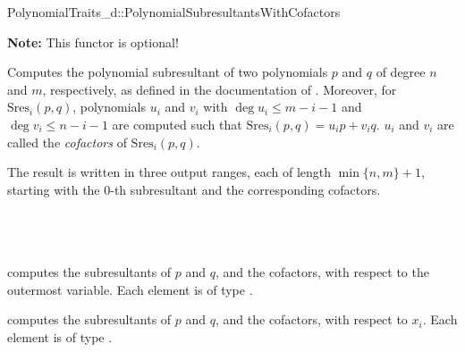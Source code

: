 \begin{ccRefConcept}{PolynomialTraits_d::PolynomialSubresultantsWithCofactors}

\textbf{Note:} This functor is optional!

\ccDefinition

Computes the polynomial subresultant of two polynomials $p$ and $q$ of degree
$n$ and $m$, respectively, 
as defined in the documentation of .
Moreover, for $\mathrm{Sres}_i(p,q)$, polynomials $u_i$ and $v_i$
with $\deg u_i\leq m-i-1$ and $\deg v_i\leq n-i-1$ are computed 
such that $\mathrm{Sres}_i(p,q)=u_i p + v_i q$. $u_i$ and $v_i$ are called
the \emph{cofactors} of $\mathrm{Sres}_i(p,q)$.
 
The result is written in three output ranges, each of length $\min\{n,m\}+1$, 
starting with the $0$-th subresultant and the corresponding cofactors.

\ccRefines 
{}\\
\\
\\

\ccOperations
{}
         { computes the subresultants of $p$ and $q$, and the cofactors, 
           with respect to the outermost variable. Each element is of type
           .}

         { computes the subresultants of $p$ and $q$, and the cofactors, 
           with respect to $x_i$. Each element is of type
           .}


\ccSeeAlso

\\
\\
\\
\\
\\
\\

\end{ccRefConcept}
